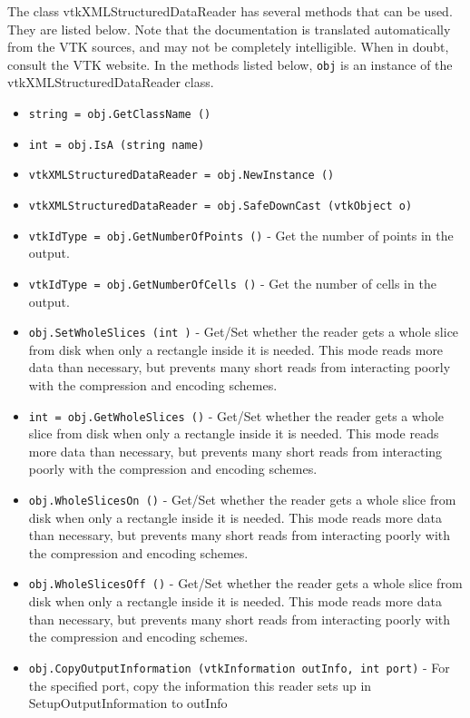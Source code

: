 The class vtkXMLStructuredDataReader has several methods that can be used.
  They are listed below.
Note that the documentation is translated automatically from the VTK sources,
and may not be completely intelligible.  When in doubt, consult the VTK website.
In the methods listed below, \verb|obj| is an instance of the vtkXMLStructuredDataReader class.
\begin{itemize}
\item  \verb|string = obj.GetClassName ()|

\item  \verb|int = obj.IsA (string name)|

\item  \verb|vtkXMLStructuredDataReader = obj.NewInstance ()|

\item  \verb|vtkXMLStructuredDataReader = obj.SafeDownCast (vtkObject o)|

\item  \verb|vtkIdType = obj.GetNumberOfPoints ()| -  Get the number of points in the output.

\item  \verb|vtkIdType = obj.GetNumberOfCells ()| -  Get the number of cells in the output.

\item  \verb|obj.SetWholeSlices (int )| -  Get/Set whether the reader gets a whole slice from disk when only
 a rectangle inside it is needed.  This mode reads more data than
 necessary, but prevents many short reads from interacting poorly
 with the compression and encoding schemes.

\item  \verb|int = obj.GetWholeSlices ()| -  Get/Set whether the reader gets a whole slice from disk when only
 a rectangle inside it is needed.  This mode reads more data than
 necessary, but prevents many short reads from interacting poorly
 with the compression and encoding schemes.

\item  \verb|obj.WholeSlicesOn ()| -  Get/Set whether the reader gets a whole slice from disk when only
 a rectangle inside it is needed.  This mode reads more data than
 necessary, but prevents many short reads from interacting poorly
 with the compression and encoding schemes.

\item  \verb|obj.WholeSlicesOff ()| -  Get/Set whether the reader gets a whole slice from disk when only
 a rectangle inside it is needed.  This mode reads more data than
 necessary, but prevents many short reads from interacting poorly
 with the compression and encoding schemes.

\item  \verb|obj.CopyOutputInformation (vtkInformation outInfo, int port)| -  For the specified port, copy the information this reader sets up in
 SetupOutputInformation to outInfo

\end{itemize}
